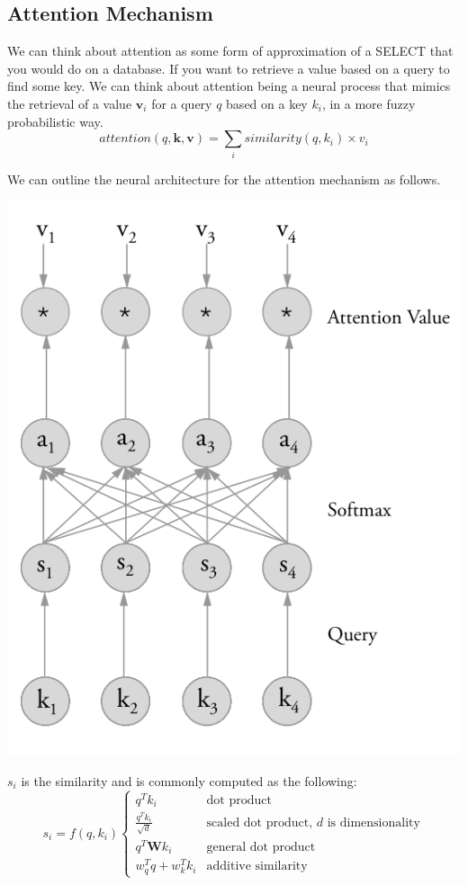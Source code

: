 \documentclass[12pt]{article}
\begin{document}
    \subsection{Attention Mechanism}
        We can think about attention as some form of approximation of a SELECT that you would do on a database. If you
        want to retrieve a value based on a query to find some key. We can think about attention being a neural process
        that mimics the retrieval of a value $\boldsymbol{v}_i$ for a query $q$ based on a key $k_i$, in a more fuzzy
        probabilistic way.
        $$ attention(q, \boldsymbol{k}, \boldsymbol{v}) = \sum_i similarity(q, k_i) \times v_i $$

        We can outline the neural architecture for the attention mechanism as follows.

        \begin{center}
            \includegraphics[scale=0.4]{AttentionMech}
        \end{center}

        $s_i$ is the similarity and is commonly computed as the following:
        \[ s_i = f(q, k_i) \begin{cases} 
            q^T k_i & \text{dot product} \\
            \frac{q^T k_i}{\sqrt{d}} & \text{scaled dot product, $d$ is dimensionality} \\
            q^T \boldsymbol{W} k_i & \text{general dot product} \\
            w^T_qq + w_k^T k_i & \text{additive similarity}
        \end{cases}
        \]
\end{document}
